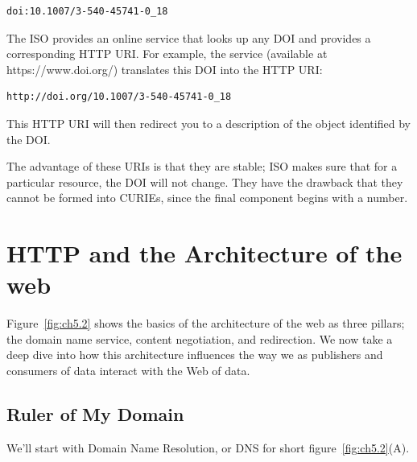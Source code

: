 \begin{lstlisting}
doi:10.1007/3-540-45741-0_18
\end{lstlisting}


The ISO  provides an online service that looks up any DOI and provides a corresponding HTTP
URI.   For example, the service (available at https://www.doi.org/) translates this DOI into the HTTP URI:


\begin{lstlisting}
http://doi.org/10.1007/3-540-45741-0_18
\end{lstlisting}


This HTTP URI will then redirect you to a description of the object
identified by the DOI.  

The advantage of these URIs is that they are stable; ISO makes sure that for a particular 
resource, the DOI will not change.  They have the drawback that they cannot be formed into 
CURIEs, since the final component begins with a number. 






\section{HTTP and the Architecture of the web}

Figure~\ref{fig:ch5.2} shows the basics of the architecture of the web as three pillars; the domain name service, content negotiation, and redirection.  We now take a deep dive into how this architecture influences the way we as  publishers and consumers of data interact with the Web of data. 

\hypertarget{king-of-my-domain}{%
\subsection{Ruler of My Domain}\label{king-of-my-domain}}

We'll start with Domain Name Resolution, or DNS for short  figure~\ref{fig:ch5.2}(A). 

